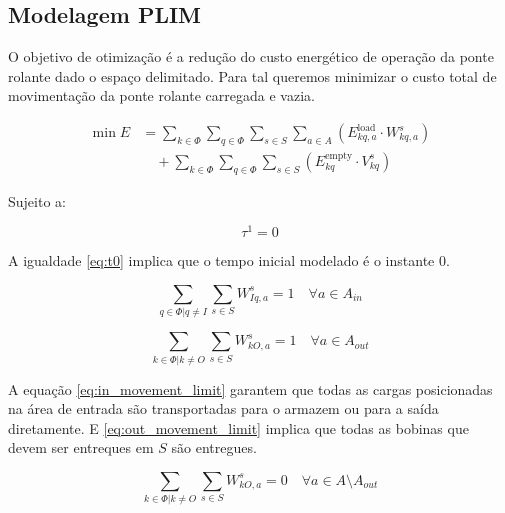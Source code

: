 \documentclass[journal]{IEEEtran}
\begin{document}
        \subsection{Modelagem PLIM}

        O objetivo de otimização é a redução do custo energético de operação da 
        ponte rolante dado o espaço delimitado. Para tal queremos minimizar o 
        custo total de movimentação da ponte rolante carregada e vazia.

        \begin{align*}
            \min E &= \sum_{k \in \Phi} \sum_{q \in \Phi} \sum_{s \in S} \sum_{a \in A} 
                    \left( E_{kq,a}^{\text{load}} \cdot W_{kq,a}^s \right) \\
                &\quad + \sum_{k \in \Phi} \sum_{q \in \Phi} \sum_{s \in S} 
                    \left( E_{kq}^{\text{empty}} \cdot V_{kq}^s \right)
            \label{eq:objetivo}
        \end{align*}


        Sujeito a:

        \begin{equation}
            \tau^{1} = 0
            \label{eq:t0}
        \end{equation}

        A igualdade \ref{eq:t0} implica que o tempo inicial modelado é o instante 0.

        \begin{equation}
            \sum_{q \in \Phi | q \neq I} \sum_{s \in S} W^s_{Iq,a} = 1 \quad \forall a \in A_{in} 
            \label{eq:in_movement_limit}
        \end{equation}

        \begin{equation}
            \sum_{k \in \Phi | k \neq O} \sum_{s \in S} W^s_{kO,a} = 1 \quad \forall a \in A_{out}
            \label{eq:out_movement_limit}
        \end{equation}

        A equação \ref{eq:in_movement_limit} 
        garantem que todas as cargas posicionadas na área de entrada são transportadas
        para o armazem ou para a saída diretamente. E  \ref{eq:out_movement_limit} 
        implica que todas as bobinas que devem ser entreques em $S$ são entregues.


        \begin{equation}
            \sum_{k \in \Phi | k \neq O} \sum_{s \in S} W^s_{kO,a} = 0 \quad \forall a \in A \setminus A_{out} 
            \label{eq:storage_requirement}
        \end{equation}
\end{document}
